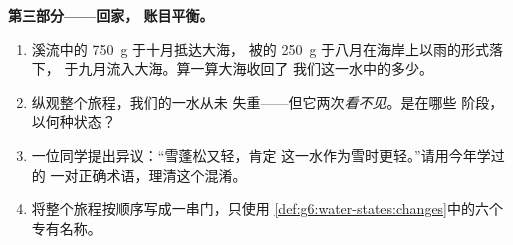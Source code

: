 \begin{problem}
\medskip\noindent\textbf{第三部分——回家，
账目平衡。}
\begin{enumerate}[resume]
  \item 溪流中的 \qty{750}{g} 于十月抵达大海，
        被的 \qty{250}{g} 于八月在海岸上以雨的形式落下，
        于九月流入大海。算一算大海收回了
        我们这一水中的多少。
  \item 纵观整个旅程，我们的一水从未
        失重——但它两次\emph{看不见}。是在哪些
        阶段，以何种状态？
  \item 一位同学提出异议：“雪蓬松又轻，肯定
        这一水作为雪时更轻。”请用今年学过的
        一对正确术语，理清这个混淆。
  \item 将整个旅程按顺序写成一串门，只使用
        \cref{def:g6:water-states:changes}中的六个
        专有名称。
\end{enumerate}
\end{problem}
